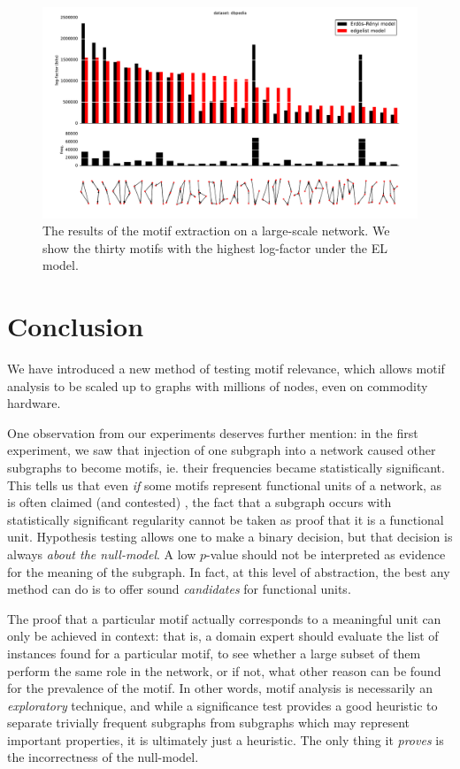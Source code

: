 \begin{figure}[htb]
  \hspace{-4cm}
  \includegraphics[width=\textwidth]{./images/large/compare-plot.pdf}
  \caption{The results of the motif extraction on a large-scale network. We show the thirty motifs with the highest log-factor under the EL model.}
  \label{figure:plot-large}
\end{figure}

\section*{Conclusion} 

We have introduced a new method of testing motif relevance, which allows motif analysis to be scaled up to graphs with millions of nodes, even on commodity hardware. 

One observation from our experiments deserves further mention: in the first experiment, we saw that injection of one subgraph into a network caused other subgraphs to become motifs, ie. their frequencies became statistically significant. This tells us that even \emph{if} some motifs represent functional units of a network, as is often claimed (and contested) \cite{milo2002network,konagurthu2008origin}, the fact that a subgraph occurs with statistically significant regularity cannot be taken as proof that it is a functional unit. Hypothesis testing allows one to make a binary decision, but that decision is always \emph{about the null-model}. A low $p$-value should not be interpreted as evidence for the meaning of the subgraph. In fact, at this level of abstraction, the best any method can do is to offer sound \emph{candidates} for functional units. 

The proof that a particular motif actually corresponds to a meaningful unit can only be achieved in context: that is, a domain expert should evaluate the list of instances found for a particular motif, to see whether a large subset of them perform the same role in the network, or if not, what other reason can be found for the prevalence of the motif. In other words, motif analysis is necessarily an \emph{exploratory} technique, and while a significance test provides a good heuristic to separate trivially frequent subgraphs from subgraphs which may represent important properties, it is ultimately just a heuristic. The only thing it \emph{proves} is the incorrectness of the null-model. 

